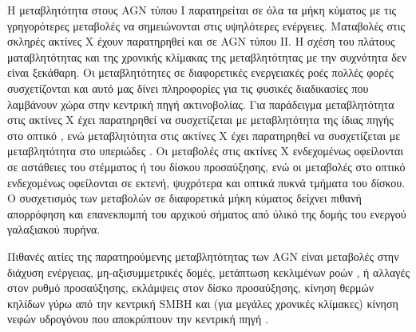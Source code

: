 Η μεταβλητότητα στους \textlatin{AGN} τύπου Ι παρατηρείται σε όλα τα μήκη κύματος με τις γρηγορότερες μεταβολές να σημειώνονται στις υψηλότερες ενέργειες. Ματαβολές στις σκληρές ακτίνες Χ έχουν παρατηρηθεί και σε \textlatin{AGN} τύπου ΙΙ. Η σχέση του πλάτους ματαβλητότητας και της χρονικής κλίμακας της μεταβλητότητας με την συχνότητα δεν είναι ξεκάθαρη. Οι μεταβλητότητες σε διαφορετικές ενεργειακές ροές πολλές φορές συσχετίζονται και αυτό μας δίνει πληροφορίες για τις φυσικές διαδικασίες που λαμβάνουν χώρα στην κεντρική πηγή ακτινοβολίας. Για παράδειγμα μεταβλητότητα στις ακτίνες Χ έχει παρατηρηθεί να συσχετίζεται με μεταβλητότητα της ίδιας πηγής στο οπτικό \cite{2006ASPC..360..101U} \cite{2006ASPC..360..111G}, ενώ μεταβλητότητα στις ακτίνες Χ έχει παρατηρηθεί να συσχετίζεται με μεταβλητότητα στο υπεριώδες \cite{2005A&A...430..435A}. Οι μεταβολές στις ακτίνες Χ ενδεχομένως οφείλονται σε αστάθειες του στέμματος ή του δίσκου προσαύξησης, ενώ οι μεταβολές στο οπτικό ενδεχομένως οφείλονται σε εκτενή, ψυχρότερα και οπτικά πυκνά τμήματα του δίσκου. Ο συσχετισμός των μεταβολών σε διαφορετικά μήκη κύματος δείχνει πιθανή απορρόφηση και επανεκπομπή του αρχικού σήματος από ύλικό της δομής του ενεργού γαλαξιακού πυρήνα.

Πιθανές αιτίες της παρατηρούμενης μεταβλητότητας των \textlatin{AGN} είναι μεταβολές στην διάχυση ενέργειας, μη-αξισυμμετρικές δομές, μετάπτωση κεκλιμένων ροών \cite{Brandt}, ή αλλαγές στον ρυθμό προσαύξησης, εκλάμψεις στον δίσκο προσαύξησης, κίνηση θερμών κηλίδων γύρω από την κεντρική \textlatin{SMBH} και (για μεγάλες χρονικές κλίμακες) κίνηση νεφών υδρογόνου που αποκρύπτουν την κεντρική πηγή \cite{2004astro.ph..9151H}.


